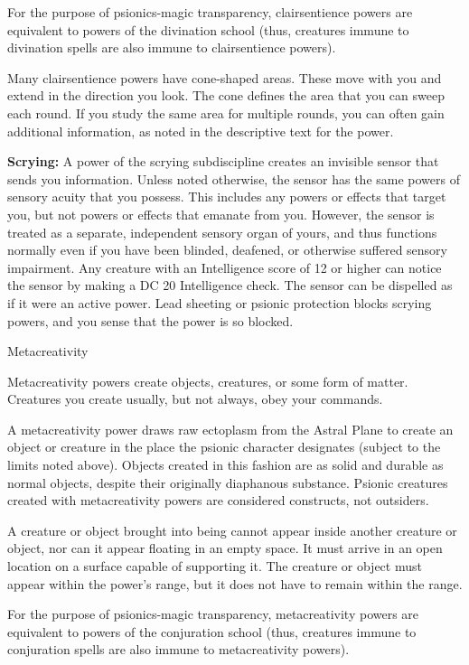 \documentclass{article}
\begin{document}
For the purpose of psionics-magic transparency, clairsentience powers are equivalent 
to powers of the divination school (thus, creatures immune to divination spells 
are also immune to clairsentience powers).

Many clairsentience powers have cone-shaped areas. These move with you and extend 
in the direction you look. The cone defines the area that you can sweep each round. 
If you study the same area for multiple rounds, you can often gain additional information, 
as noted in the descriptive text for the power.

\textbf{Scrying:} A power of the scrying subdiscipline creates an invisible sensor 
that sends you information. Unless noted otherwise, the sensor has the same powers 
of sensory acuity that you possess. This includes any powers or effects that target 
you, but not powers or effects that emanate from you. However, the sensor is treated 
as a separate, independent sensory organ of yours, and thus functions normally 
even if you have been blinded, deafened, or otherwise suffered sensory impairment. 
Any creature with an Intelligence score of 12 or higher can notice the sensor by 
making a DC 20 Intelligence check. The sensor can be dispelled as if it were an 
active power. Lead sheeting or psionic protection blocks scrying powers, and you 
sense that the power is so blocked.

\vspace{12pt}
Metacreativity

Metacreativity powers create objects, creatures, or some form of matter. Creatures 
you create usually, but not always, obey your commands.

A metacreativity power draws raw ectoplasm from the Astral Plane to create an object 
or creature in the place the psionic character designates (subject to the limits 
noted above). Objects created in this fashion are as solid and durable as normal 
objects, despite their originally diaphanous substance. Psionic creatures created 
with metacreativity powers are considered constructs, not outsiders.

A creature or object brought into being cannot appear inside another creature or 
object, nor can it appear floating in an empty space. It must arrive in an open 
location on a surface capable of supporting it. The creature or object must appear 
within the power's range, but it does not have to remain within the range.

For the purpose of psionics-magic transparency, metacreativity powers are equivalent 
to powers of the conjuration school (thus, creatures immune to conjuration spells 
are also immune to metacreativity powers).
\end{document}
